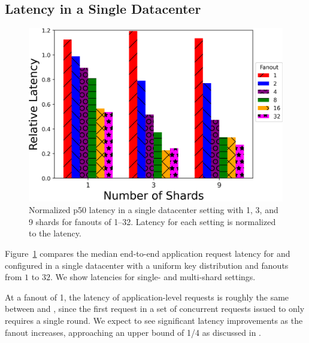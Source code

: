 \subsection{Latency in a Single Datacenter}
\label{sec:shards}
\begin{figure}[tbp]
\centering
  \includegraphics[width=\linewidth]{figs/singleDC.png}
  \vspace{3pt}
\caption{Normalized p50 latency in a single datacenter setting with 1, 3, and 9 shards for fanouts of 1--32. Latency for each setting is normalized to the \mpaxos{} latency.}
\label{fig:DC}
\end{figure}

Figure~\ref{fig:DC} compares the median
end-to-end application request latency for \system{} and \mpaxos{}
configured in a single datacenter with a uniform key distribution and fanouts from $1$ to $32$. We show latencies for single- and multi-shard settings.

At a fanout of 1, the latency of application-level requests is roughly the same between \system{} and \mpaxos{}, since the first request in a set of concurrent requests issued to \system{} only requires a single round. We expect to see significant latency improvements as the fanout increases, approaching an upper bound of 1/4 as discussed in .

